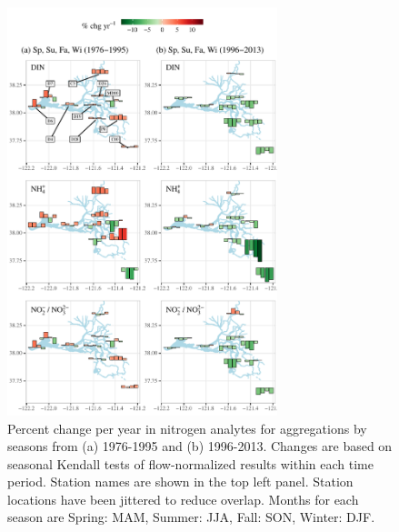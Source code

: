 \documentclass[journal = esthag, manuscript = article]{achemso}\usepackage[]{graphicx}\usepackage[]{color}
\begin{document}
\begin{figure}[!ht]

{\centering \includegraphics[width=0.7\textwidth]{figs/trndmap-1} 

}

\caption[Percent change per year in nitrogen analytes for aggregations by seasons from (a) 1976-1995 and (b) 1996-2013]{Percent change per year in nitrogen analytes for aggregations by seasons from (a) 1976-1995 and (b) 1996-2013.  Changes are based on seasonal Kendall tests of flow-normalized results within each time period. Station names are shown in the top left panel. Station locations have been jittered to reduce overlap. Months for each season are Spring: MAM, Summer: JJA, Fall: SON, Winter: DJF.}\label{fig:trndmap}
\end{figure}
\end{document}
